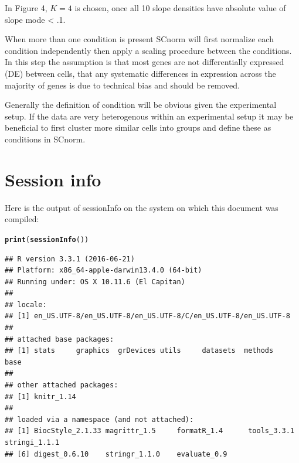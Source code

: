 \documentclass{article}\usepackage[]{graphicx}\usepackage[usenames,dvipsnames]{color}
\makeatletter
\newcommand{\hlstd}[1]{\textcolor[rgb]{0.345,0.345,0.345}{#1}}%
\newcommand{\hlkwd}[1]{\textcolor[rgb]{0.737,0.353,0.396}{\textbf{#1}}}%
\newenvironment{kframe}{%
 \def\at@end@of@kframe{}%
 \ifinner\ifhmode%
  \def\at@end@of@kframe{\end{minipage}}%
  \begin{minipage}{\columnwidth}%
 \fi\fi%
 \def\FrameCommand##1{\hskip\@totalleftmargin \hskip-\fboxsep
 \colorbox{shadecolor}{##1}\hskip-\fboxsep
     \hskip-\linewidth \hskip-\@totalleftmargin \hskip\columnwidth}%
 \MakeFramed {\advance\hsize-\width
   \@totalleftmargin\z@ \linewidth\hsize
   \@setminipage}}%
 {\par\unskip\endMakeFramed%
 \at@end@of@kframe}
\newenvironment{knitrout}{}{} %
\makeatother
\begin{document}
In Figure 4, $K = 4$ is chosen, once all 10 slope densities have absolute value of slope mode < .1.

\newpage

When more than one condition is present SCnorm will first normalize each condition independently then apply a scaling procedure between the conditions. In this step the assumption is that most genes are not differentially expressed (DE) between cells, that any systematic differences in expression across the majority of genes is due to technical bias and should be removed.

Generally the definition of condition will be obvious given the experimental setup. If the data are very heterogenous within an experimental setup it may be beneficial to first cluster more similar cells into groups and define these as conditions in SCnorm.

\section{Session info}
Here is the output of sessionInfo on the system on which this document was compiled:
\begin{knitrout}
\color{fgcolor}\begin{kframe}
\begin{alltt}
  \hlkwd{print}\hlstd{(}\hlkwd{sessionInfo}\hlstd{())}
\end{alltt}
\begin{verbatim}
## R version 3.3.1 (2016-06-21)
## Platform: x86_64-apple-darwin13.4.0 (64-bit)
## Running under: OS X 10.11.6 (El Capitan)
## 
## locale:
## [1] en_US.UTF-8/en_US.UTF-8/en_US.UTF-8/C/en_US.UTF-8/en_US.UTF-8
## 
## attached base packages:
## [1] stats     graphics  grDevices utils     datasets  methods   base     
## 
## other attached packages:
## [1] knitr_1.14
## 
## loaded via a namespace (and not attached):
## [1] BiocStyle_2.1.33 magrittr_1.5     formatR_1.4      tools_3.3.1      stringi_1.1.1   
## [6] digest_0.6.10    stringr_1.1.0    evaluate_0.9
\end{verbatim}
\end{kframe}
\end{knitrout}
  
  \vspace{1cm}
%


%
\end{document}
